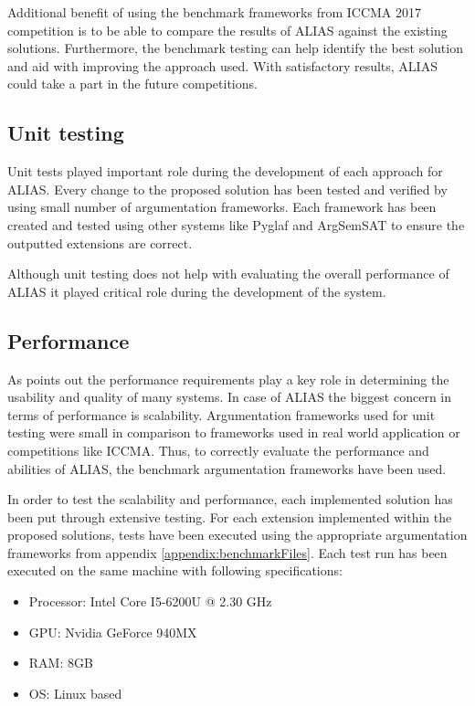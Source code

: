Additional benefit of using the benchmark frameworks from ICCMA 2017 competition is to be able to compare the results of ALIAS against the existing solutions. Furthermore, the benchmark testing can help identify the best solution and aid with improving the approach used. With satisfactory results, ALIAS could take a part in the future competitions.

\subsection{Unit testing}
Unit tests played important role during the development of each approach for ALIAS. Every change to the proposed solution has been tested and verified by using small number of argumentation frameworks. Each framework has been created and tested using other systems like Pyglaf and ArgSemSAT to ensure the outputted extensions are correct. 

Although unit testing does not help with evaluating the overall performance of ALIAS it played critical role during the development of the system. 

\subsection{Performance}
As \citet{performanceTesting1} points out the performance requirements play a key role in determining the usability and quality of many systems. In case of ALIAS the biggest concern in terms of performance is scalability. Argumentation frameworks used for unit testing were small in comparison to frameworks used in real world application or competitions like ICCMA. Thus, to correctly evaluate the performance and abilities of ALIAS, the benchmark argumentation frameworks have been used.

In order to test the scalability and performance, each implemented solution has been put through extensive testing. For each extension implemented within the proposed solutions, tests have been executed using the appropriate argumentation frameworks from appendix \ref{appendix:benchmarkFiles}. Each test run has been executed on the same machine with following specifications:

\begin{itemize}
	\item Processor: Intel Core I5-6200U @ 2.30 GHz
	\item GPU: Nvidia GeForce 940MX
	\item RAM: 8GB
	\item OS: Linux based
\end{itemize}

